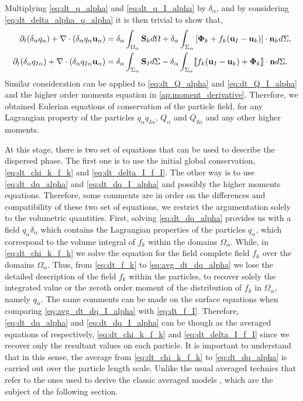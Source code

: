 Multiplying \ref{eq:dt_q_alpha} and \ref{eq:dt_q_I_alpha} by $\delta_\alpha$, and by considering \ref{eq:dt_delta_alpha_q_alpha} it is then trivial to show that,
\begin{align}
    \partial_t (\delta_\alpha q_\alpha)
    + \mathbf{\nabla} \cdot (\delta_\alpha q_\alpha \textbf{u}_\alpha)
    &= \delta_\alpha\int_{\Omega_\alpha} \textbf{S}_k d\Omega
    + \delta_\alpha\int_{\Sigma_\alpha} \left[\mathbf{\Phi}_k + f_k (\textbf{u}_I-\textbf{u}_k) \right] \cdot \textbf{n}_k d\Sigma,
    \label{eq:dt_dq_alpha}\\
    \partial_t (\delta_\alpha q_{I\alpha})
    + \mathbf{\nabla} \cdot(\delta_\alpha q_{I\alpha} \textbf{u}_\alpha)
    &= \delta_\alpha\int_{\Sigma_\alpha} 
        \textbf{S}_I
    d\Sigma
    - \delta_\alpha\int_{\Sigma_\alpha} \llbracket 
        f_k (\textbf{u}_I - \textbf{u}_k)
        + \mathbf{\Phi}_k
     \rrbracket \cdot \textbf{n}
    d\Sigma.
    \label{eq:dt_dq_I_alpha}
\end{align}
Similar consideration can be applied to \ref{eq:dt_Q_alpha} and \ref{eq:dt_Q_I_alpha} and the higher order moments equation in \ref{ap:moment_derivative}.
Therefore, we obtained Eulerian equations of conservation of the particle field, for any Lagrangian property of the particles $q_\alpha$\;$q_{I\alpha}$, $Q_\alpha$ and $Q_{I\alpha}$ and any other higher moments. 

At this stage, there is two set of equations that can be used to describe the dispersed phase. 
The first one is to use the initial global conservation, \ref{eq:dt_chi_k_f_k} and \ref{eq:dt_delta_I_f_I}. 
The other way is to use \ref{eq:dt_dq_alpha} and \ref{eq:dt_dq_I_alpha} and possibly the higher moments equations.
Therefore, some comments are in order on the differences and compatibility of these two set of equations, we restrict the argumentation solely to the volumetric quantities.
First, solving \ref{eq:dt_dq_alpha} provides us with a field $q_\alpha\delta_\alpha$ which contains the Lagrangian properties of the particles $q_\alpha$, which correspond to the volume integral of $f_k$ within the domains $\Omega_\alpha$.
While, in \ref{eq:dt_chi_k_f_k} we solve the equation for the field complete field $f_k$ over the domains $\Omega_\alpha$.  
Thus, from  \ref{eq:dt_f_k} to \ref{eq:avg_dt_dq_alpha} we lose the detailed description of the field $f_k$ within the particles, to recover solely the integrated value or the zeroth order moment of the distribution of $f_k$ in $\Omega_\alpha$, namely $q_\alpha$. 
The same comments can be made on the surface equations when comparing \ref{eq:avg_dt_dq_I_alpha} with \ref{eq:dt_f_I}. 
Therefore, \ref{eq:dt_dq_alpha} and \ref{eq:dt_dq_I_alpha} can be though as the averaged equations of respectively, \ref{eq:dt_chi_k_f_k} and  \ref{eq:dt_delta_I_f_I} since we recover only the resultant values on each particle. 
It is important to understand that in this sense, the average from \ref{eq:dt_chi_k_f_k} to \ref{eq:dt_dq_alpha} is carried out over the particle length scale.
Unlike the usual averaged technics that refer to the ones used to derive the classic averaged models \citep{jackson1997locally,zhang1994averaged}, which are the subject of the following section. 


